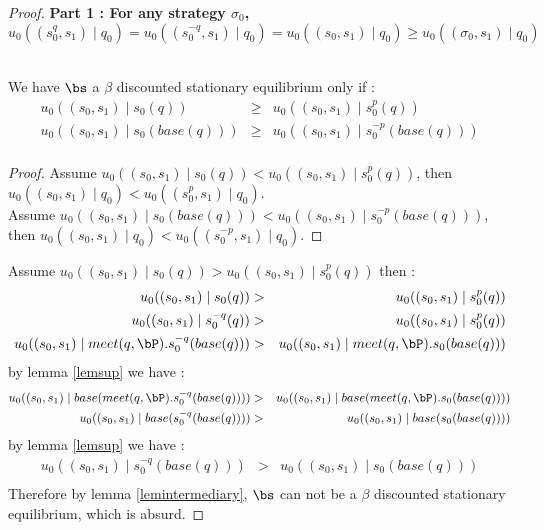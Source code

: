 \begin{proof}
	


\textbf{ Part 1 : For any strategy $\sigma_0$,  $$u_0((s^q_0,s_1) \mid q_0) = u_0((s^{-q}_0,s_1) \mid q_0) = u_0((s_0,s_1) \mid q_0) \geq u_0((\sigma_0,s_1) \mid q_0)$$ }\

\begin{mylem}
	We have $\bs$ a $\beta$ discounted stationary equilibrium only if :
	\begin{eqnarray*}
		u_0((s_0,s_1) \mid s_0(q)) & \geq & u_0((s_0,s_1) \mid s^p_0(q))\\ 
		u_0((s_0,s_1) \mid s_0(base(q))) & \geq & u_0((s_0,s_1) \mid s^{-p}_0(base(q))) \\ 
	\end{eqnarray*}
\end{mylem}
\begin{proof}
	
	Assume $u_0((s_0,s_1) \mid s_0(q))  <  u_0((s_0,s_1) \mid s^p_0(q))$,
	then  $u_0((s_0,s_1) \mid q_0) < u_0((s^p_0,s_1) \mid q_0)$.
	\\Assume $u_0((s_0,s_1) \mid s_0(base(q))) < u_0((s_0,s_1) \mid s^{-p}_0(base(q)))$,
	then  $u_0((s_0,s_1) \mid q_0) < u_0((s^{-p}_0,s_1) \mid q_0)$.
	
\end{proof}

	

Assume $u_0((s_0,s_1) \mid s_0(q)) > u_0((s_0,s_1) \mid s^p_0(q)) $ then :
\begin{eqnarray*}
u_0((s_0,s_1) \mid s_0(q)) &>& u_0((s_0,s_1) \mid s^p_0(q)) \\
u_0((s_0,s_1) \mid s^{-q}_0(q)) &>&  u_0((s_0,s_1) \mid s^p_0(q)) \\
u_0((s_0,s_1) \mid meet(q,\bP).s^{-q}_0(base(q))) &>& u_0((s_0,s_1) \mid meet(q,\bP) . s_0(base(q))) \\
\end{eqnarray*}
by lemma \ref{lemsup} we have : 
\begin{eqnarray*}
	u_0((s_0,s_1) \mid base(meet(q,\bP).s^{-q}_0(base(q)))) &>& u_0((s_0,s_1) \mid base(meet(q,\bP) . s_0(base(q)))) \\
	u_0((s_0,s_1) \mid base(s^{-q}_0(base(q)))) &>& u_0((s_0,s_1) \mid base(s_0(base(q)))) \\
\end{eqnarray*}
by lemma \ref{lemsup} we have : 
\begin{eqnarray*}
	u_0((s_0,s_1) \mid s^{-q}_0(base(q))) &>& u_0((s_0,s_1) \mid s_0(base(q))) \\
\end{eqnarray*}
Therefore by lemma \ref{lemintermediary}, $\bs$ can not be a $\beta$ discounted stationary equilibrium, which is absurd. 


\end{proof}
